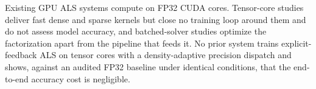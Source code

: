 
Existing GPU ALS systems compute on FP32 CUDA cores. Tensor-core studies deliver fast dense and sparse kernels but close no training loop around them and do not assess model accuracy, and batched-solver studies optimize the factorization apart from the pipeline that feeds it. No prior system trains explicit-feedback ALS on tensor cores with a density-adaptive precision dispatch and shows, against an audited FP32 baseline under identical conditions, that the end-to-end accuracy cost is negligible.
